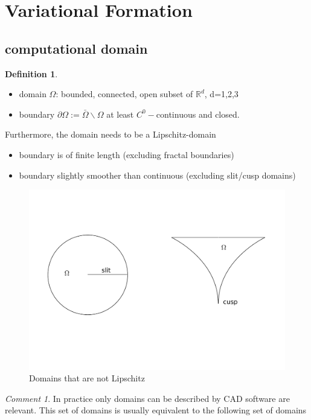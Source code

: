 \documentclass[english]{article}
\theoremstyle{definition}
\newtheorem*{defi}{Definition}
\theoremstyle{remark}
\newtheorem*{comm}{Comment}
\newcommand{\p}{\partial}
\newcommand{\RR}{\mathbb{R}}			%
\newcommand{\OO}{\Omega}
\begin{document}
\section{Variational Formation}
\subsection{computational domain}
\begin{defi}
  \begin{itemize}
  \item domain $\OO$: bounded, connected, open subset of $\RR^d$, d=1,2,3
  \item boundary $\p\OO:=\bar\OO \backslash \OO$ at least $C^0-$continuous and closed.
  \end{itemize}
  Furthermore, the domain needs to be a Lipschitz-domain
  \begin{itemize}
  \item boundary is of finite length (excluding fractal boundaries)
  \item boundary slightly smoother than continuous (excluding slit/cusp domains)
  \end{itemize}
\end{defi}

\begin{figure}[H]
  \begin{center}
    \includegraphics[width=\textwidth]{figs/notLipschitzDomain.pdf}
  \end{center}
  \caption{Domains that are not Lipschitz}
  \label{not-lipschitz-figure}
\end{figure}

\begin{comm}
  In practice only domains can be described by CAD software are relevant. This set of domains is usually equivalent to the following set of domains\end{comm}
\end{document}
